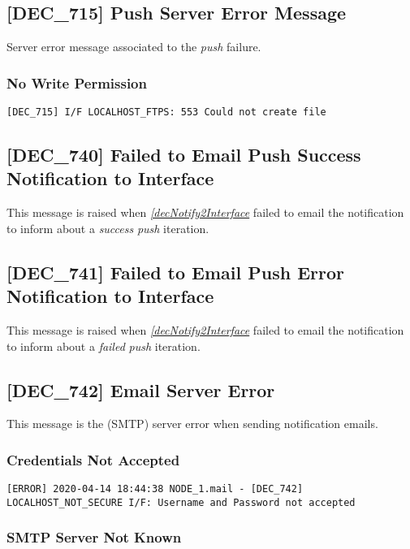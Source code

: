 \documentclass[dec_sum_main.tex]{subfiles}
\begin{document}
\label{DEC715}
\subsection{[DEC\_715] Push Server Error Message}
Server error message associated to the \textit{push} failure. 

\subsubsection{No Write Permission }
\begin{verbatim}
[DEC_715] I/F LOCALHOST_FTPS: 553 Could not create file
\end{verbatim}

\label{DEC740}
\subsection{[DEC\_740] Failed to Email Push Success Notification to Interface}
This message is raised when \hyperref[decNotify2Interface]{\textit{[decNotify2Interface}} failed to email the notification to inform about a \textit{success} \textit{push} iteration.

\label{DEC741}
\subsection{[DEC\_741] Failed to Email Push Error Notification to Interface}
This message is raised when \hyperref[decNotify2Interface]{\textit{[decNotify2Interface}} failed to email the notification to inform about a \textit{failed} \textit{push} iteration.

\label{DEC742}
\subsection{[DEC\_742] Email Server Error}
This message is the (SMTP) server error when sending notification emails.

\subsubsection{Credentials Not Accepted}

\begin{verbatim}
[ERROR] 2020-04-14 18:44:38 NODE_1.mail - [DEC_742] LOCALHOST_NOT_SECURE I/F: Username and Password not accepted
\end{verbatim}

\subsubsection{SMTP Server Not Known}
\end{document}
